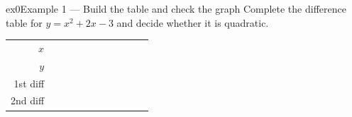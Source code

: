 \documentclass[11pt]{article}
\begin{document}
\begin{example}{ex0}{Example 1 --- Build the table and check the graph}
Complete the difference table for $y=x^2+2x-3$ and decide whether it is quadratic.
\begin{center}\renewcommand{\arraystretch}{1.15}\setlength{\tabcolsep}{2pt}\begin{tabular}{r|>{\centering\arraybackslash}p{0.62cm}>{\centering\arraybackslash}p{0.62cm}>{\centering\arraybackslash}p{0.62cm}>{\centering\arraybackslash}p{0.62cm}>{\centering\arraybackslash}p{0.62cm}>{\centering\arraybackslash}p{0.62cm}>{\centering\arraybackslash}p{0.62cm}>{\centering\arraybackslash}p{0.62cm}>{\centering\arraybackslash}p{0.62cm}>{\centering\arraybackslash}p{0.62cm}}
$x$ & \multicolumn{2}{c}{\colorbox{iagreen}{\makebox[1.12cm]{\strut \color{white}\bfseries $-3$}}} & \multicolumn{2}{c}{\colorbox{iagreen}{\makebox[1.12cm]{\strut \color{white}\bfseries $-2$}}} & \multicolumn{2}{c}{\colorbox{iagreen}{\makebox[1.12cm]{\strut \color{white}\bfseries $-1$}}} & \multicolumn{2}{c}{\colorbox{iagreen}{\makebox[1.12cm]{\strut \color{white}\bfseries $0$}}} & \multicolumn{2}{c}{\colorbox{iagreen}{\makebox[1.12cm]{\strut \color{white}\bfseries $1$}}} \\[2pt]
$y$ & \multicolumn{2}{c}{\colorbox{keybg}{\makebox[1.12cm]{\strut $0$}}} & \multicolumn{2}{c}{\colorbox{keybg}{\makebox[1.12cm]{\strut $-3$}}} & \multicolumn{2}{c}{\colorbox{keybg}{\makebox[1.12cm]{\strut $-4$}}} & \multicolumn{2}{c}{\colorbox{keybg}{\makebox[1.12cm]{\strut $-3$}}} & \multicolumn{2}{c}{\colorbox{keybg}{\makebox[1.12cm]{\strut $0$}}} \\[2pt]
\textcolor{exblue}{\scriptsize 1st diff} & & \multicolumn{2}{c}{\colorbox{exbg}{\makebox[1.12cm]{\strut \textcolor{exblue}{$-3$}}}} & \multicolumn{2}{c}{\colorbox{exbg}{\makebox[1.12cm]{\strut \textcolor{exblue}{$-1$}}}} & \multicolumn{2}{c}{\colorbox{exbg}{\makebox[1.12cm]{\strut \textcolor{exblue}{$+1$}}}} & \multicolumn{2}{c}{\colorbox{exbg}{\makebox[1.12cm]{\strut \textcolor{exblue}{$+3$}}}} & \\[2pt]
\textcolor{qorange}{\scriptsize 2nd diff} & & & \multicolumn{2}{c}{\colorbox{qbg}{\makebox[1.12cm]{\strut \textcolor{qorange!70!black}{$+2$}}}} & \multicolumn{2}{c}{\colorbox{qbg}{\makebox[1.12cm]{\strut \textcolor{qorange!70!black}{$+2$}}}} & \multicolumn{2}{c}{\colorbox{qbg}{\makebox[1.12cm]{\strut \textcolor{qorange!70!black}{$+2$}}}} & & \\
\end{tabular}\end{center}

\end{example}
\end{document}
